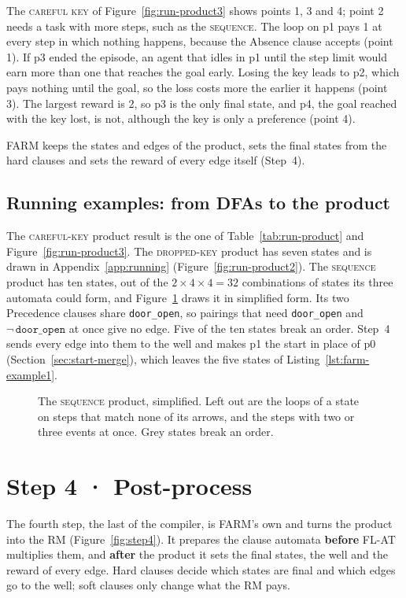 \documentclass[11pt,english,listoffigures,listoftables]{tfgetsinf}
\newcommand{\runex}[1]{\textsc{#1}}  %
\begin{document}
The \runex{careful key} of Figure~\ref{fig:run-product3} shows points 1, 3 and 4; point 2 needs a task with more steps, such as the \runex{sequence}. The loop on p1 pays 1 at every step in which nothing happens, because the Absence clause accepts (point 1). If p3 ended the episode, an agent that idles in p1 until the step limit would earn more than one that reaches the goal early. Losing the key leads to p2, which pays nothing until the goal, so the loss costs more the earlier it happens (point 3). The largest reward is 2, so p3 is the only final state, and p4, the goal reached with the key lost, is not, although the key is only a preference (point 4).

FARM keeps the states and edges of the product, sets the final states from the hard clauses and sets the reward of every edge itself (Step~4). 


\subsection{Running examples: from DFAs to the product}
\label{sec:run-step3}
The \runex{careful-key} product result is the one of Table~\ref{tab:run-product} and Figure~\ref{fig:run-product3}. The \runex{dropped-key} product has seven states and is drawn in Appendix~\ref{app:running} (Figure~\ref{fig:run-product2}). The \runex{sequence} product has ten states, out of the $2 \times 4 \times 4 = 32$ combinations of states its three automata could form, and Figure~\ref{fig:run-product1} draws it in simplified form. Its two Precedence clauses share \texttt{door\_open}, so pairings that need \texttt{door\_open} and $\neg\,\texttt{door\_open}$ at once give no edge. Five of the ten states break an order. Step~4 sends every edge into them to the well and makes p1 the start in place of p0 (Section~\ref{sec:start-merge}), which leaves the five states of Listing~\ref{lst:farm-example1}.

\begin{figure}[H]
\centering
{}
\caption[Product of the \runex{sequence}]{The \runex{sequence} product, simplified. Left out are the loops of a state on steps that match none of its arrows, and the steps with two or three events at once. Grey states break an order.}
\label{fig:run-product1}
\end{figure}

\section{Step 4 · Post-process}
\label{sec:step4}
The fourth step, the last of the compiler, is FARM's own and turns the product into the RM (Figure~\ref{fig:step4}). It prepares the clause automata \textbf{before} FL-AT multiplies them, and \textbf{after} the product it sets the final states, the well and the reward of every edge. Hard clauses decide which states are final and which edges go to the well; soft clauses only change what the RM pays.
\end{document}
